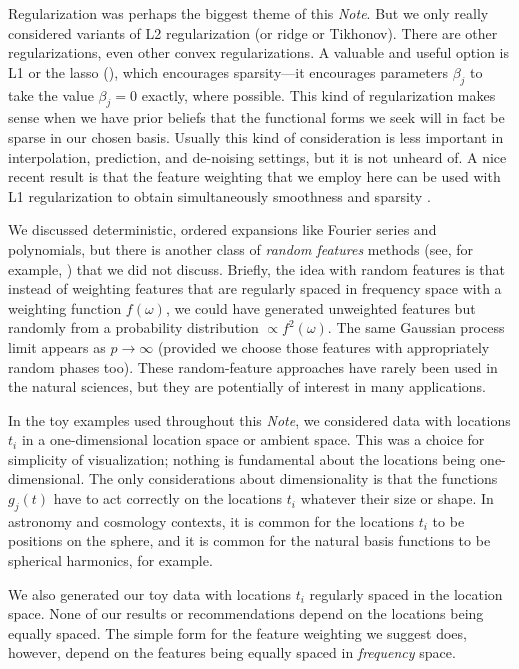 \documentclass[12pt,letterpaper]{article}
\newcommand{\documentname}{\textsl{Note}}
\begin{document}
Regularization was perhaps the biggest theme of this \documentname.
But we only really considered variants of L2 regularization (or ridge or Tikhonov).
There are other regularizations, even other convex regularizations.
A valuable and useful option is L1 or the lasso (\citealt{lasso}), which encourages sparsity---it encourages parameters $\beta_j$ to take the value $\beta_j=0$ exactly, where possible.
This kind of regularization makes sense when we have prior beliefs that the functional forms we seek will in fact be sparse in our chosen basis.
Usually this kind of consideration is less important in interpolation, prediction, and de-noising settings, but it is not unheard of.
A nice recent result is that the feature weighting that we employ here can be used with L1 regularization to obtain simultaneously smoothness and sparsity \citep{rauhut2016interpolation}.

We discussed deterministic, ordered expansions like Fourier series and polynomials, but there is another class of \emph{random features} methods (see, for example, \citealt{rahimi2007random}) that we did not discuss.
Briefly, the idea with random features is that instead of weighting features that are regularly spaced in frequency space with a weighting function $f(\omega)$, we could have generated unweighted features but randomly from a probability distribution $\propto f^2(\omega)$.
The same Gaussian process limit appears as $p\rightarrow\infty$ (provided we choose those features with appropriately random phases too).
These random-feature approaches have rarely been used in the natural sciences, but they are potentially of interest in many applications.

In the toy examples used throughout this \documentname, we considered data with locations $t_i$ in a one-dimensional location space or ambient space.
This was a choice for simplicity of visualization; nothing is fundamental about the locations being one-dimensional.
The only considerations about dimensionality is that the functions $g_j(t)$ have to act correctly on the locations $t_i$ whatever their size or shape.
In astronomy and cosmology contexts, it is common for the locations $t_i$ to be positions on the sphere, and it is common for the natural basis functions to be spherical harmonics, for example.

We also generated our toy data with locations $t_i$ regularly spaced in the location space.
None of our results or recommendations depend on the locations being equally spaced.
The simple form for the feature weighting we suggest does, however, depend on the features being equally spaced in \emph{frequency} space.
\end{document}
